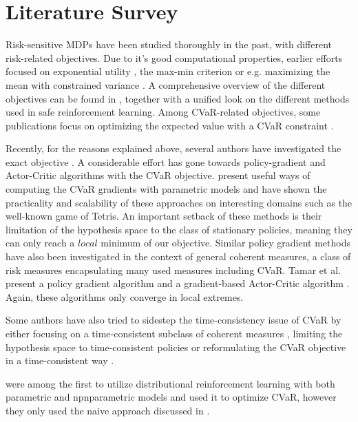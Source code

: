 \section{Literature Survey}\label{sec:prelim:literature}

Risk-sensitive MDPs have been studied thoroughly in the past, with different risk-related objectives. Due to it's good computational properties, earlier efforts focused on exponential utility \citep{howard1972risk}, the max-min criterion \cite{minmax} or e.g. maximizing the mean with constrained variance \citep{sobel1982variance}. A comprehensive overview of the different objectives can be found in \citet{garcia2015comprehensive}, together with a unified look on the different methods used in safe reinforcement learning. Among CVaR-related objectives, some publications focus on optimizing the expected value with a CVaR constraint \citep{borkar2010risk, prashanth2014policy}.

Recently, for the reasons explained above, several authors have investigated the exact objective . A considerable effort has gone towards policy-gradient \citep{sutton2000policy} and Actor-Critic \citep{konda2000actor} algorithms with the CVaR objective. \citet{tamar2015optimizing, chow2014algorithms} present useful ways of computing the CVaR gradients with parametric models and have shown the practicality and scalability of these approaches on interesting domains such as the well-known game of Tetris. An important setback of these methods is their limitation of the hypothesis space to the class of stationary policies, meaning they can only reach a $local$ minimum of our objective.
Similar policy gradient methods have also been investigated in the context of general coherent measures, a class of risk measures encapsulating many used measures including CVaR. Tamar et al. present a policy gradient algorithm \citep{tamar2017sequential} and a gradient-based Actor-Critic algorithm \citep{tamar2017sequential}. Again, these algorithms only converge in local extremes.

Some authors have also tried to sidestep the time-consistency issue of CVaR by either focusing on a time-consistent subclass of coherent measures \cite{???}, limiting the hypothesis space to time-consistent policies or reformulating the CVaR objective in a time-consistent way \cite{miller2017optimal}.

\citet{morimura2010nonparametric, morimura2012parametric} were among the first to utilize distributional reinforcement learning with both parametric and npnparametric models and used it to optimize CVaR, however they only used the naive approach discussed in .

